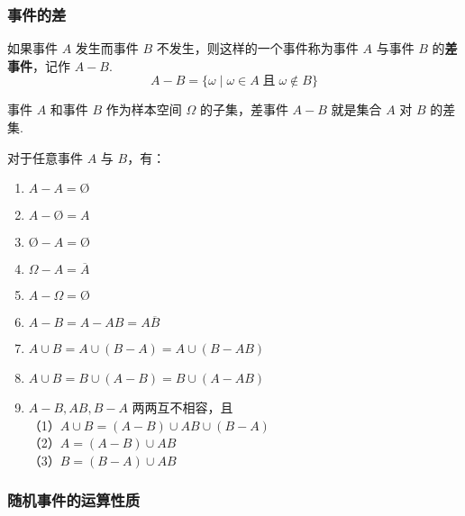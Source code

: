 \subsubsection{事件的差}

如果事件 $A$ 发生而事件 $B$ 不发生，则这样的一个事件称为事件 $A$ 与事件 $B$ 的\textbf{差事件}，记作 $A-B$.
$$
A - B = \{ \omega \mid \omega \in A \;\text{且}\; \omega \notin B \}
$$

事件 $A$ 和事件 $B$ 作为样本空间 $\varOmega$ 的子集，差事件 $A - B$ 就是集合 $A$ 对 $B$ 的差集.

\begin{property}
    \indent 对于任意事件 $A$ 与 $B$，有：
    \begin{enumerate}
        \item $A - A = \text{\O}$
        \item $A - \text{\O} = A$
        \item $\text{\O} - A = \text{\O}$
        \item $\varOmega - A = \overline{A}$
        \item $A - \varOmega = \text{\O}$
        \item $A - B = A - AB = A \overline{B}$
        \item $A \cup B = A \cup (B-A) = A \cup (B-AB)$
        \item $A \cup B = B \cup (A-B) = B \cup (A-AB)$
        \item $A-B,AB,B-A$ 两两互不相容，且 \\
        （1）$A \cup B = (A-B) \cup AB \cup (B-A)$ \\
        （2）$A = (A-B) \cup AB$ \\
        （3）$B = (B-A) \cup AB$
    \end{enumerate}
\end{property}

\subsubsection{随机事件的运算性质}

